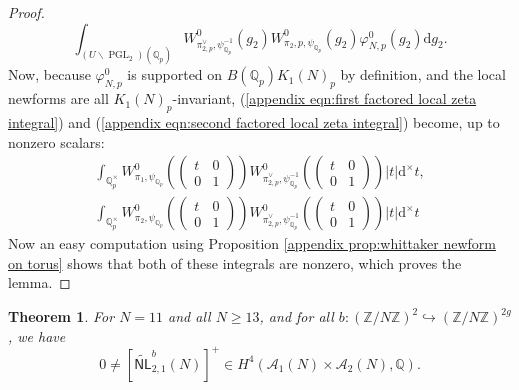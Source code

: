 \documentclass[12pt]{amsart}
\newtheorem{thm}{Theorem}[section]
\theoremstyle{definition}
\newcommand{\Z}{\mathbb{Z}}
\newcommand{\Q}{\mathbb{Q}}
\renewcommand{\d}{\mathrm{d}}
\begin{document}
\begin{proof}
\begin{equation}
        \int_{(U\backslash \operatorname{PGL}_2)(\Q_p)}W_{\pi_{2,p}^\vee,\psi_{\Q_p}^{-1}}^0(g_2) W^0_{\pi_2,p,\psi_{\Q_p}}(g_2)\varphi^0_{N,p} (g_2) \d g_2.
\end{equation}
Now, because $\varphi^0_{N,p}$ is supported on $B(\Q_p) K_1(N)_p$ by definition, and the local newforms are all $K_1(N)_p$-invariant, (\ref{appendix eqn:first factored local zeta integral}) and (\ref{appendix eqn:second factored local zeta integral}) become, up to nonzero scalars:
\begin{equation*}
\begin{split}
    \int_{\Q_p^\times} W^0_{\pi_1,\psi_{\Q_p}} \left(\begin{pmatrix}
         t & 0 \\ 0 & 1
    \end{pmatrix}\right) W_{\pi_{2,p}^\vee, \psi_{\Q_p}^{-1}}^0\left(\begin{pmatrix}
         t & 0 \\ 0 & 1
    \end{pmatrix}\right) |t| \d ^\times
t,\\   \int_{\Q_p^\times} W^0_{\pi_2,\psi_{\Q_p}} \left(\begin{pmatrix}
         t & 0 \\ 0 & 1
    \end{pmatrix}\right) W_{\pi_{2,p}^\vee, \psi_{\Q_p}^{-1}}^0\left(\begin{pmatrix}
         t & 0 \\ 0 & 1
    \end{pmatrix}\right) |t| \d ^\times t
    \end{split}
\end{equation*}
Now an easy computation using Proposition \ref{appendix prop:whittaker newform on torus} shows that both of these integrals are nonzero, which proves the lemma.
\end{proof}


\begin{thm}\label{main appendix theorem}
    For $N = 11$ and all $N \geq 13$, and for all $b: (\Z/N\Z)^2 \hookrightarrow (\Z/N\Z)^{2g}$, we have $$0 \neq [\widetilde{\mathsf{NL}}_{2,1}^b(N)]^+\in H^4(\mathcal A_1(N)\times \mathcal A_2(N), \Q).$$
\end{thm}
\end{document}
